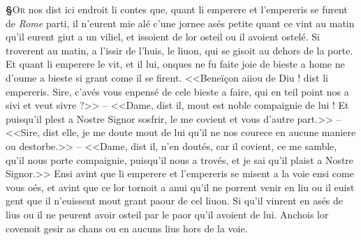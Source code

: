 \documentclass[12pt]{article} %
\newcommand{\placeName}[1]{\emph{#1}} %
\newcommand{\supplied}[1]{\textlangle#1\textrangle} %
\newcounter{paranum}
\newcommand{\pnum}{\stepcounter{paranum}\textbf{§\arabic{paranum}}\quad}
\begin{document}
\pnum \lettrine[lines=4]{\color{darkred}O}{r} nos dist ici endroit li contes que, quant li emperere et l'empereris se furent de \placeName{Rome} parti, il n'eurent mie alé c'une jornee asés petite quant ce vint au matin qu'il eurent giut a un viliel, et issoient de lor osteil ou il avoient ostelé. Si troverent au matin, a l'issir de l'huis, le liuon, qui se gisoit au dehors de la porte. Et quant li emperere le vit, et il lui, onques ne fu faite joie de bieste a home ne d'oume a bieste si grant come il se firent. <<Beneïçon aiiou de Diu ! dist li empereris. Sire, c'avés vous enpens\supplied{é} de cele bieste a faire, qui en teil point nos a sivi et veut sivre ?>> -- <<Dame, dist il, mout est noble compaignie de lui ! Et puisqu'il plest a Nostre Signor sosfrir, le me covient et vous d'autre part.>> -- <<Sire, dist elle, je me doute mout de lui qu'il ne nos courece en aucune maniere ou destorbe.>> -- <<Dame, dist il, n'en doutés, car il covient, ce me samble, qu'il nous porte compaignie, puisqu'il nous a trovés, et je sai qu'il plaist a Nostre Signor.>> Ensi avi\supplied{n}t que li emperere et l'empereris se misent a la voie ensi come vous oés, et avint que ce lor tornoit a anui qu'il ne porrent venir en liu ou il euist gent que il n'euissent mout grant paour de cel liuon. Si qu'il vinrent en asés de lius ou il ne peurent avoir osteil par le paor qu'il avoient de lui. Anchois lor covenoit gesir as chans ou en aucuns lius hors de la voie.
\end{document}
